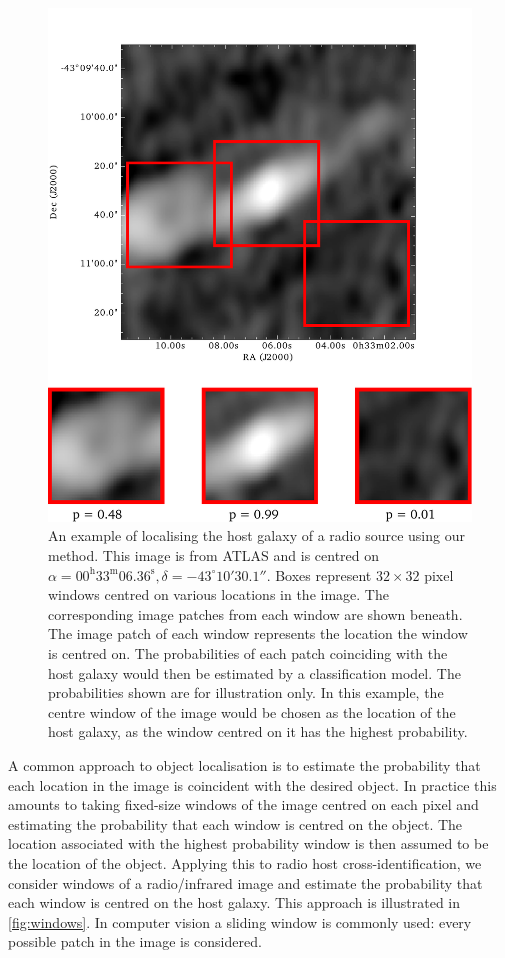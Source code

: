 \documentclass[fleqn,usenatbib,usedcolumn]{mnras}
\begin{document}
    \begin{figure}
      \centering
      \includegraphics[width=0.8\columnwidth]{images/elais_0093C1_with_boxes}
      \caption{An example of localising the host galaxy of a radio source using
        our method. This image is from ATLAS and is centred on $\alpha =
        00^\text{h}33^\text{m}06.36^\text{s}, \delta = -43^\circ{}10'30.1''$. Boxes
        represent $32 \times 32$ pixel windows centred on various locations in
        the image. The corresponding image patches from each window are shown
        beneath. The image patch of each window represents the location the
        window is centred on. The probabilities of each patch coinciding with
        the host galaxy would then be estimated by a classification model. The
        probabilities shown are for illustration only. In this example, the
        centre window of the image would be chosen as the location of the host
        galaxy, as the window centred on it has the highest probability.}
      \label{fig:windows}
    \end{figure}

    A common approach to object localisation is to estimate the probability
    that each location in the image is coincident with the desired object. In
    practice this amounts to taking fixed-size windows of the image centred on
    each pixel and estimating the probability that each window is centred on
    the object. The location associated with the highest probability window is
    then assumed to be the location of the object. Applying this to radio host
    cross-identification, we consider windows of a radio/infrared image and
    estimate the probability that each window is centred on the host galaxy.
    This approach is illustrated in \autoref{fig:windows}.
    In computer vision a sliding window is commonly used: every possible patch
    in the image is considered.
\end{document}
